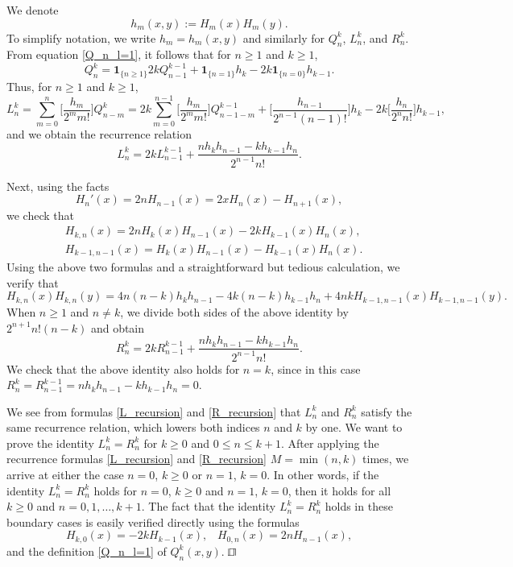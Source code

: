 \documentclass[12pt]{article}
\def\qed{\hfill$\sqcap\kern-8.0pt\hbox{$\sqcup$}$\\}
\begin{document}
We denote 
\[
h_m(x,y):=H_m(x)H_m(y).
\] 
To simplify notation, we  write $h_m=h_m(x,y)$ and similarly for $Q_n^k$, $L_n^k$, and $R_n^k$. From equation \eqref{Q_n_l=1}, it follows that for $n\geqslant 1$ and $k\geqslant 1$,
\[
Q_n^k={\mathbf 1}_{\{n\geqslant 1\}} 2k Q_{n-1}^{k-1} + 
{\mathbf 1}_{\{n=1\}} h_k-2k {\mathbf 1}_{\{n=0\}} h_{k-1}. 
\]
Thus, for $n\geqslant 1$ and $k\geqslant 1$,
\[
L_n^k=\sum_{m=0}^{n}
\bigg[ \frac{h_m}{2^m m!}\bigg]
Q_{n-m}^k=2 k \sum_{m=0}^{n-1}
\bigg[ 
\frac{h_m}{2^m m!}\bigg]
Q_{n-1-m}^{k-1}+\bigg[\frac{h_{n-1}}{2^{n-1} (n-1)!}\bigg] h_k
-2k \bigg[\frac{h_{n}}{2^{n} n!}\bigg] h_{k-1},
\]
and we obtain the recurrence relation 
\begin{equation}\label{L_recursion}
L_n^k=2 k L_{n-1}^{k-1}+\frac{nh_k h_{n-1}-k h_{k-1} h_n}{2^{n-1} n!}.
\end{equation}

Next, using the facts 
\[
H_n'(x)=2n H_{n-1}(x)=2x H_n(x)-H_{n+1}(x),
\]
we check that 
\begin{align*}
&H_{k,n}(x)=2n H_k(x) H_{n-1}(x)-2k H_{k-1}(x)H_n(x), \\
&H_{k-1,n-1}(x)=H_{k}(x)H_{n-1}(x) -H_{k-1}(x) H_{n}(x). 
\end{align*}
Using the above two formulas and a straightforward but  tedious calculation, we verify that 
\[
H_{k,n}(x)H_{k,n}(y)=4n(n-k)h_k h_{n-1} - 4 k (n-k) h_{k-1} h_n+4 n k H_{k-1,n-1}(x) H_{k-1,n-1}(y).
\]
When $n\geqslant 1$ and $n\neq k$, we divide both sides of the above identity 
by $2^{n+1} n! (n-k)$ and obtain  
\begin{equation}\label{R_recursion}
R_n^k=2 k R_{n-1}^{k-1}+\frac{nh_k h_{n-1}-k h_{k-1} h_n}{2^{n-1} n!}. 
\end{equation}
We check that the above identity also holds for $n=k$, since in this case $R_n^k=R_{n-1}^{k-1}=nh_k h_{n-1}-k h_{k-1} h_n=0$.

We see from formulas \eqref{L_recursion} and \eqref{R_recursion} that $L_n^k$ and $R_n^k$ satisfy the same recurrence relation, which lowers both indices $n$ and $k$ by one. We want to prove the identity $L_n^k=R_n^k$ for $k\geqslant 0$ and $0\leqslant n \leqslant k+1$. After applying the recurrence formulas \eqref{L_recursion} and \eqref{R_recursion}  $M=\min(n,k)$ times, we arrive at either the case $n=0$, $k\geqslant 0$ or $n=1$, $k=0$. In other words, if the identity $L_n^k=R_n^k$ holds for $n=0$, $k\geqslant 0$ and  $n=1$, $k=0$, then it holds for all $k\geqslant 0$ and $n=0,1,\dots,k+1$. The fact that the identity $L_n^k=R_n^k$ holds in these boundary cases is easily verified directly using the formulas 
\[
H_{k,0}(x)=-2k H_{k-1}(x), \;\;\; H_{0,n}(x)=2n H_{n-1}(x),
\]
and the definition \eqref{Q_n_l=1} of $Q_n^k(x,y)$. 
\qed
\end{document}
